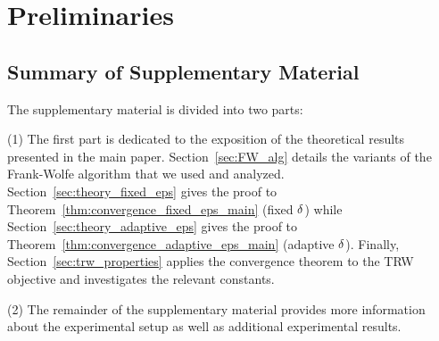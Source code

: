 \section{Preliminaries}

\subsection{Summary of Supplementary Material}
The supplementary material is divided into two parts: 

(1) The first part is dedicated to the exposition
of the theoretical results presented in the main paper. 
Section~\ref{sec:FW_alg} details the variants of the Frank-Wolfe algorithm that we used and analyzed.
Section~\ref{sec:theory_fixed_eps} gives the proof to Theorem~\ref{thm:convergence_fixed_eps_main} (fixed $\delta$) while Section~\ref{sec:theory_adaptive_eps} gives the proof to Theorem~\ref{thm:convergence_adaptive_eps_main} (adaptive $\delta$). Finally, Section~\ref{sec:trw_properties} applies the convergence theorem to the TRW objective and investigates the relevant constants.

(2) The remainder of the supplementary material provides more information about the experimental setup as well as additional experimental results.

%
%


